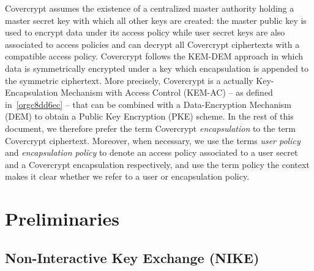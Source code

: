 \documentclass[a4paper]{article}
\theoremstyle{definition}
\begin{document}
Covercrypt assumes  the existence  of a centralized  master authority  holding a
master secret key with  which all other keys are created:  the master public key
is used to encrypt data under its  access policy while user secret keys are also
associated to access policies and can  decrypt all Covercrypt ciphertexts with a
compatible access policy.  Covercrypt follows the KEM-DEM approach in which data
is symmetrically  encrypted under a key  which encapsulation is appended  to the
symmetric ciphertext. More precisely, Covercrypt is a actually Key-Encapsulation
Mechanism with  Access Control  (KEM-AC) --  as defined  in \ref{orgc8dd6ec} --
that can be  combined with a Data-Encryption Mechanism (DEM)  to obtain a Public
Key Encryption (PKE) scheme.  In the  rest of this document, we therefore prefer
the term Covercrypt \emph{encapsulation} to the term Covercrypt ciphertext. Moreover,
when necessary,  we use the  terms \emph{user  policy} and \emph{encapsulation  policy} to
denote  an  access  policy  associated  to   a  user  secret  and  a  Covercrypt
encapsulation respectively, and  use the term policy the context  makes it clear
whether we refer to a user or encapsulation policy.
\section{Preliminaries}
\label{sec:org1dda04b}

\subsection{Non-Interactive Key Exchange (NIKE)}
\label{sec:org594e973}
\end{document}
